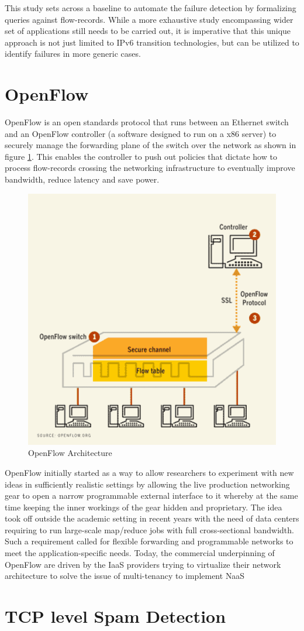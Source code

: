 This study sets across a baseline to automate the failure detection by formalizing queries against flow-records. While a more exhaustive study encompassing wider set of applications still needs to be carried out, it is imperative that this unique approach is not just limited to IPv$6$ transition technologies, but can be utilized to identify failures in more generic cases.

\section{OpenFlow}\label{sec:openflow}
OpenFlow \cite{nmckeown:2008} is an open standards protocol that runs between an Ethernet switch and an OpenFlow controller (a software designed to run on a x$86$ server) to securely manage the forwarding plane of the switch over the network as shown in figure \ref{fig:openflow-architecture}. This enables the controller to push out policies that dictate how to process flow-records crossing the networking infrastructure to eventually improve bandwidth, reduce latency and save power. 
\begin{figure}[h!]
\begin{center}
  \includegraphics* [width=0.5\linewidth]{figures/openflow}	
  \caption{OpenFlow Architecture \cite{newscientist:2009}}
  \label{fig:openflow-architecture}
\end{center}
\end{figure}

OpenFlow initially started as a way to allow researchers to experiment with new ideas in sufficiently realistic settings by allowing the live production networking gear to open a narrow programmable external interface to it whereby at the same time keeping the inner workings of the gear hidden and proprietary.  The idea took off outside the  academic setting in recent years with the need of data centers requiring to run large-scale map/reduce jobs with full cross-sectional bandwidth. Such a requirement called for flexible forwarding and programmable networks to meet the application-specific needs. Today, the commercial underpinning of OpenFlow are driven by the \ac{IaaS} providers trying to virtualize their network architecture to solve the issue of multi-tenancy to implement \ac{NaaS}

\section{TCP level Spam Detection}\label{sec:spam-detection}